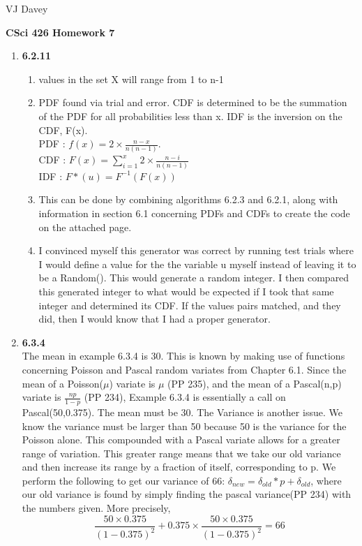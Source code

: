 \documentclass[11pt]{article}
\begin{document}
\centerline{VJ Davey}\vskip 0.10cm
\begin{LARGE}
\centerline {\bf CSci 426 Homework 7}
\end{LARGE}
\vskip 0.25cm
\begin{enumerate}
	\item \textbf{6.2.11 }
	\begin{enumerate}
		\item values in the set X will range from 1 to n-1
		\item PDF found via trial and error. CDF is determined to be the summation of the PDF for all probabilities less than x. IDF is the inversion on the CDF, F(x). 
		\\PDF : $f(x)  = 2\times\frac{n-x}{n(n-1)}$.
		\\CDF : $F(x)  = \sum^{x}_{i=1} 2\times\frac{n-i}{n(n-1)}$
		\\IDF : $F*(u) = F^{-1}(F(x)) $
		\item This can be done by combining algorithms 6.2.3 and 6.2.1, along with information in section 6.1 concerning PDFs and CDFs to create the code on the attached page.
		\item I convinced myself this generator was correct by running test trials where I would define a value for the the variable u myself instead of leaving it to be a Random(). This would generate a random integer. I then compared this generated integer to what would be expected if I took that same integer and determined its CDF. If the values pairs matched, and they did, then I would know that I had a proper generator. 
	\end{enumerate}
	\item\textbf{6.3.4}
	\\The mean in example 6.3.4 is 30. This is known by making use of functions concerning Poisson and Pascal random variates from Chapter 6.1. Since the mean of a Poisson($\mu$) variate is $\mu$ (PP 235), and the mean of a Pascal(n,p) variate is $\frac{np}{1-p}$ (PP 234), Example 6.3.4 is essentially a call on Pascal(50,0.375). The mean must be 30. 
	The Variance is another issue. We know the variance must be larger than 50 because 50 is the variance for the Poisson alone. This compounded with a Pascal variate allows for a greater range of variation. This greater range means that we take our old variance and then increase its range by a fraction of itself, corresponding to p. We perform the following to get our variance of 66:  $\delta_{new} = \delta_{old}*p + \delta_{old}$, where our old variance is found by simply finding the pascal variance(PP 234) with the numbers given. More precisely,
	$$\frac{50\times0.375}{(1-0.375)^2} + 0.375\times \frac{50\times0.375}{(1-0.375)^2} = 66$$
\end{enumerate}
\end{document}
